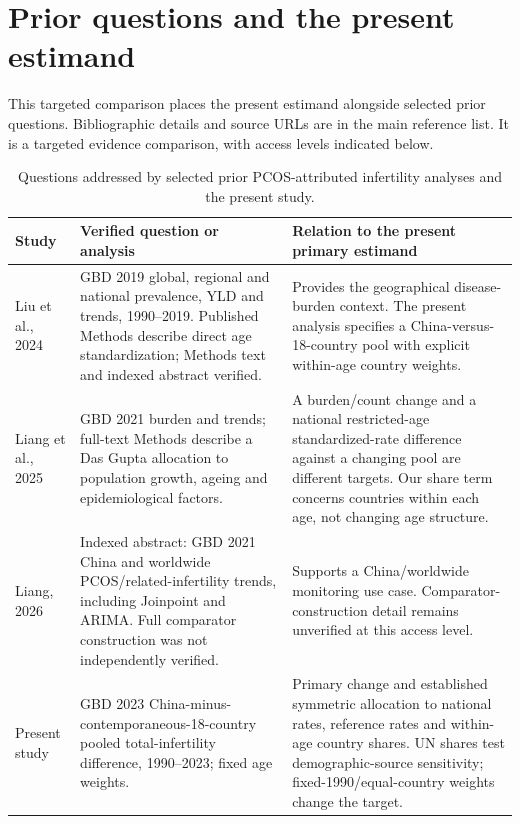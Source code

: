 \documentclass[11pt,a4paper]{article}
\begin{document}
\clearpage
\setcounter{table}{8}
\section*{Prior questions and the present estimand}
This targeted comparison places the present estimand alongside selected prior questions. Bibliographic details and source URLs are in the main reference list. It is a targeted evidence comparison, with access levels indicated below.
\small
\begin{longtable}{p{}p{}p{}}
\caption{Questions addressed by selected prior PCOS-attributed infertility analyses and the present study.}\\
\toprule Study & Verified question or analysis & Relation to the present primary estimand\\\midrule\endhead
Liu et al., 2024 & GBD 2019 global, regional and national prevalence, YLD and trends, 1990--2019. Published Methods describe direct age standardization; Methods text and indexed abstract verified. & Provides the geographical disease-burden context. The present analysis specifies a China-versus-18-country pool with explicit within-age country weights.\\
Liang et al., 2025 & GBD 2021 burden and trends; full-text Methods describe a Das Gupta allocation to population growth, ageing and epidemiological factors. & A burden/count change and a national restricted-age standardized-rate difference against a changing pool are different targets. Our share term concerns countries within each age, not changing age structure.\\
Liang, 2026 & Indexed abstract: GBD 2021 China and worldwide PCOS/related-infertility trends, including Joinpoint and ARIMA. Full comparator construction was not independently verified. & Supports a China/worldwide monitoring use case. Comparator-construction detail remains unverified at this access level.\\
Present study & GBD 2023 China-minus-contemporaneous-18-country pooled total-infertility difference, 1990--2023; fixed age weights. & Primary change and established symmetric allocation to national rates, reference rates and within-age country shares. UN shares test demographic-source sensitivity; fixed-1990/equal-country weights change the target.\\\bottomrule
\end{longtable}\normalsize


\clearpage
\end{document}
